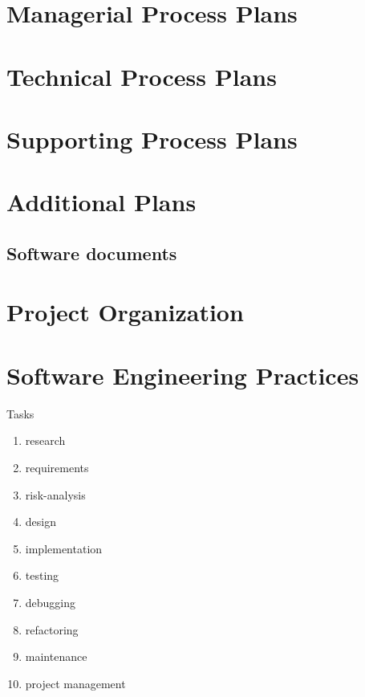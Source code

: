 \documentclass{article}[12pt]
\begin{document}
\section{Managerial Process Plans} \label{s:managerial}
\section{Technical Process Plans} \label{s:technical}
\section{Supporting Process Plans} \label{s:supporting}
\section{Additional Plans} \label{s:Additional Plans}



\subsection{Software documents}


\section{Project Organization} \label{s:intro}

\section{Software Engineering Practices}


Tasks

\begin{enumerate}
\item research
\item requirements
\item risk-analysis
\item design
\item implementation
\item testing
\item debugging
\item refactoring
\item maintenance
\item project management
\end{enumerate}
\end{document}

